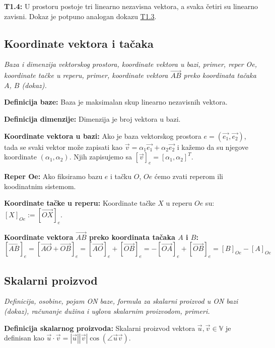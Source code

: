 \documentclass[12pt]{article}
\newcommand{\vek}[1]{\overrightarrow{#1}}
\begin{document}
\textbf{T1.4:} U prostoru postoje tri linearno nezavisna vektora, a svaka četiri su
linearno zavisni. Dokaz je potpuno analogan dokazu \hyperref[theorem:1.3]{T1.3}.


\subsection{Koordinate vektora i tačaka}
\textit{Baza i dimenzija vektorskog prostora, koordinate vektora u bazi,
    primer, reper Oe, koordinate tačke u reperu, primer, koordinate vektora
    $\vek{AB}$ preko koordinata tačaka $A$, $B$ (dokaz).}
\par
\vspace*{1cm}

\textbf{Definicija baze:} Baza je maksimalan skup linearno nezavisnih vektora.
\par

\textbf{Definicija dimenzije:} Dimenzija je broj vektora u bazi.
\par

\textbf{Koordinate vektora u bazi:} Ako je baza vektorskog prostora
$e=(\vek{e_1}, \vek{e_2})$, tada se svaki vektor može zapisati kao
$\vek{v}=\alpha_1\vek{e_1}+\alpha_2\vek{e_2}$ i kažemo da su njegove
koordinate $(\alpha_1, \alpha_2)$. Njih zapisujemo sa
$[\vek{v}]_e=[\alpha_1, \alpha_2]^T$.
\par

\textbf{Reper Oe:} Ako fiksiramo bazu $e$ i tačku $O$, $Oe$ ćemo zvati reperom
ili koodinatnim sistemom.
\par

\textbf{Koordinate tačke u reperu:} Koordinate tačke $X$ u reperu $Oe$ su:
$[X]_{Oe}:=[\vek{OX}]_e$.
\par

\textbf{Koordinate vektora $\vek{AB}$ preko koordinata tačaka $A$ i $B$:}
$$[\vek{AB}]_e=[\vek{AO}+\vek{OB}]_e=[\vek{AO}]_e+[\vek{OB}]_e=
    -[\vek{OA}]_e+[\vek{OB}]_e=[B]_{Oe}-[A]_{Oe}$$


\subsection{Skalarni proizvod}
\textit{Definicija, osobine, pojam ON baze, formula za skalarni proizvod u ON
    bazi (dokaz), računanje dužina i uglova skalarnim proizvodom, primeri.}
\par
\vspace*{1cm}

\textbf{Definicija skalarnog proizvoda:} Skalarni proizvod vektora
$\vek{u},\vek{v}\in\mathbb{V}$ je definisan kao $\vek{u}\cdot\vek{v}=|\vek{u}|
    |\vek{v}|\cos(\angle{\vek{u}\vek{v}})$.
\par
\end{document}
